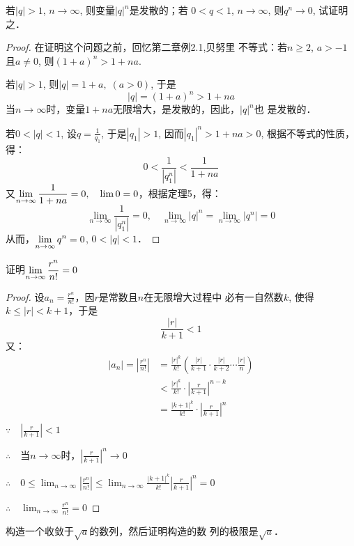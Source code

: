 \begin{example}
    若$|q|>1$, $n\to\infty$, 则变量$|q|^n$是发散的；若
$0<q<1$, $n\to\infty$, 则$q^n\to 0$, 试证明之．
\end{example}



\begin{proof}
在证明这个问题之前，回忆第二章例2.1,贝努里
不等式：若$n\ge 2$, $a>-1$且$a\ne 0$, 则$(1+a)^n>1+na$.

若$|q|>1$, 则$|q|=1+a,\; (a>0)$, 于是
\[|q|=(1+a)^n>1+na\]
当$n\to\infty$时，变量$1+na$无限增大，是发散的，因此，$|q|^n$也
是发散的．

若$0<|q|<1$, 设$q=\frac{1}{q_1}$,
于是$|q_1|>1$, 因而$|q_1|^n>1+na>0$, 根据不等式的性质，
得：
\[0<\frac{1}{|q^n_1|}<\frac{1}{1+na}\]
又$\displaystyle\lim_{n\to\infty}\dfrac{1}{1+na}=0,\quad \lim 0=0$，根据定理5，得：
\[\lim_{n\to\infty}\frac{1}{|q^n_1|}=0,\quad \lim_{n\to\infty}|q|^n=\lim_{n\to\infty}|q^n|=0\]
从而，$\displaystyle\lim_{n\to\infty}q^n=0$, $0<|q|<1$．
\end{proof}

\begin{example}
    证明$\displaystyle\lim_{n\to\infty}\dfrac{r^n}{n!}=0$
\end{example}

\begin{proof}
设$a_n=\frac{r^n}{n!}$，因$r$是常数且$n$在无限增大过程中
必有一自然数$k$, 使得$k\le |r|<k+1$，于是
\[\frac{|r|}{k+1}<1\]
又：
\[\begin{split}
|a_n|=\left|\frac{r^n}{n!}\right|&=\frac{|r|^k}{k!}\left(\frac{|r|}{k+1}\cdot \frac{|r|}{k+2}\cdots \frac{|r|}{n}\right)\\
&<\frac{|r|^k}{k!}\cdot \left|\frac{r}{k+1}\right|^{n-k}\\
&=\frac{|k+1|^k}{k!}\cdot \left|\frac{r}{k+1}\right|^{n}\\
\end{split}\]
$\because\quad  \left|\frac{r}{k+1}\right|<1$

$\therefore\quad $当$n\to\infty$时，$ \left|\frac{r}{k+1}\right|^n\to 0$
    
$\therefore\quad 0\le \lim_{n\to\infty}\left|\frac{r^n}{n!}\right|\le \lim_{n\to\infty}\frac{|k+1|^k}{k!} \left|\frac{r}{k+1}\right|^{n}=0$

$\therefore\quad \lim_{n\to\infty}\frac{r^n}{n!}=0$
\end{proof}

\begin{example}
    构造一个收敛于$\sqrt{a}$的数列，然后证明构造的数
列的极限是$\sqrt{a}$．
\end{example}

